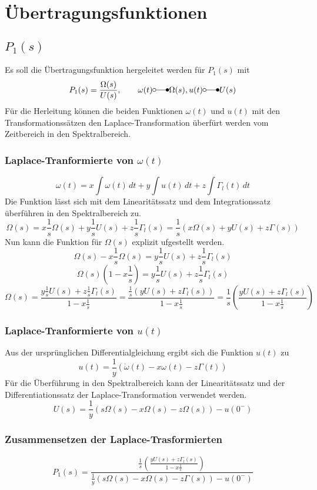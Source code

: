 \section{Übertragungsfunktionen}
\subsection{$P_1(s)$}
Es soll die Übertragungsfunktion hergeleitet werden für $P_1(s)$ mit
\[
	P_1(s) = \frac{\Omega(s)}{U(s)},
	\qquad
	\omega(t) \laplace \Omega(s),
	u(t) \laplace U(s)
\]
Für die Herleitung können die beiden Funktionen $\omega(t)$ und $u(t)$ mit
den Transformationssätzen den Laplace-Transformation überfürt werden vom
Zeitbereich in den Spektralbereich.
\subsubsection{Laplace-Tranformierte von $\omega(t)$}\label{sec:ex_2a}
\[
	\omega(t)
	= x \int\omega(t)\,dt
		+ y \int u(t)\,dt
		+ z \int \Gamma_l(t)\,dt
\]
Die Funktion lässt sich mit dem Linearitätssatz und dem Integrationssatz
überführen in den Spektralbereich zu.
\[
	\Omega(s)
	= x \frac{1}{s} \Omega(s)
		+ y \frac{1}{s} U(s)
		+ z \frac{1}{s} \Gamma_l(s)
	= \frac{1}{s} \left( x \Omega(s) + y U(s) + z \Gamma(s) \right)		
\]
Nun kann die Funktion für $\Omega(s)$ explizit ufgestellt werden.
\[
	\Omega(s) - x \frac{1}{s} \Omega(s)
	= y \frac{1}{s} U(s) + z \frac{1}{s} \Gamma_l(s)
\]
\[
	\Omega(s) \left( 1 - x \frac{1}{s} \right)
	= y \frac{1}{s} U(s) + z \frac{1}{s} \Gamma_l(s) 
\]
\[
	\Omega(s)
	= \frac{
			y \frac{1}{s} U(s) + z \frac{1}{s} \Gamma_l(s)
		}{
			1 - x \frac{1}{s}
		}
	= \frac{
			\frac{1}{s} \left( y U(s) + z \Gamma_l(s) \right)
		}{
			1 - x \frac{1}{s}
		}
	= \frac{1}{s} \left( \frac{
			y U(s) + z \Gamma_l(s)	
		}{
			1 - x \frac{1}{s}
		} \right)
\]

\subsubsection{Laplace-Tranformierte von $u(t)$}
Aus der ursprünglichen Differentialgleichung ergibt sich die Funktion
$u(t)$ zu
\[
	u(t)
	= \frac{1}{y} \left( \dot\omega(t)
		- x \omega(t)
		- z \Gamma(t) \right)
\]
Für die Überführung in den Spektralbereich kann der Linearitätssatz und der
Differentiationssatz der Laplace-Transformation verwendet werden.
\[
	U(s)
	= \frac{1}{y} \left( s \Omega(s)
		-  x \Omega(s)
		-  z \Omega(s) \right) - u(0^-)
\]

\subsubsection{Zusammensetzen der Laplace-Trasformierten}
\[
	P_1(s) =
		\frac{
			\frac{1}{s} \left(
				\frac{y U(s) + z \Gamma_l(s)}{1 - x \frac{1}{s}}
			\right)
		}{
			\frac{1}{y} \left(
				s \Omega(s)
				- x \Omega(s)
				- z \Gamma(s) 
			\right) - u(0^-)
		}
\]

